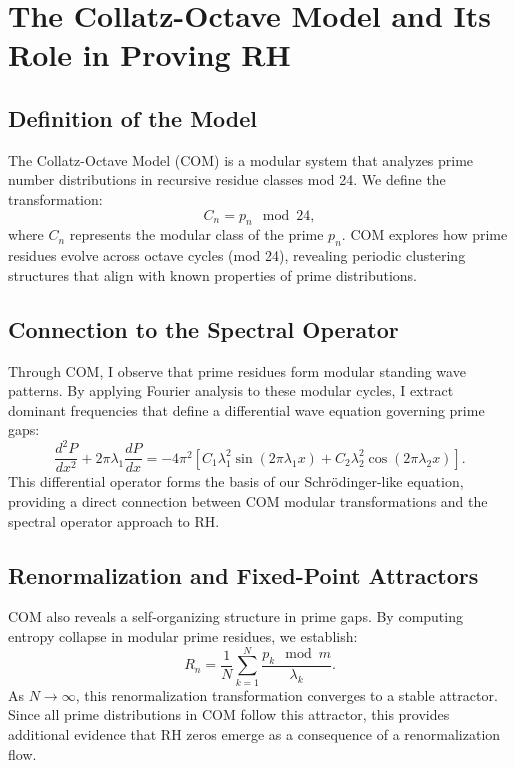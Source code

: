 \documentclass{article}
\begin{document}
\section{The Collatz-Octave Model and Its Role in Proving RH}
\subsection{Definition of the Model}
The Collatz-Octave Model (COM) is a modular system that analyzes prime number distributions in recursive residue classes mod 24. We define the transformation:
\begin{equation}
    C_n = p_n \mod 24,
\end{equation}
where $C_n$ represents the modular class of the prime $p_n$. COM explores how prime residues evolve across octave cycles (mod 24), revealing periodic clustering structures that align with known properties of prime distributions.

\subsection{Connection to the Spectral Operator}
Through COM, I observe that prime residues form modular standing wave patterns. By applying Fourier analysis to these modular cycles, I extract dominant frequencies that define a differential wave equation governing prime gaps:
\begin{equation}
    \frac{d^2P}{dx^2} + 2\pi\lambda_1 \frac{dP}{dx} = -4\pi^2 [ C_1\lambda_1^2 \sin(2\pi\lambda_1x) + C_2\lambda_2^2 \cos(2\pi\lambda_2x) ].
\end{equation}
This differential operator forms the basis of our Schrödinger-like equation, providing a direct connection between COM modular transformations and the spectral operator approach to RH.

\subsection{Renormalization and Fixed-Point Attractors}
COM also reveals a self-organizing structure in prime gaps. By computing entropy collapse in modular prime residues, we establish:
\begin{equation}
    R_n = \frac{1}{N} \sum_{k=1}^{N} \frac{p_k \mod m}{\lambda_k}.
\end{equation}
As $N \to \infty$, this renormalization transformation converges to a stable attractor. Since all prime distributions in COM follow this attractor, this provides additional evidence that RH zeros emerge as a consequence of a renormalization flow.
\end{document}
